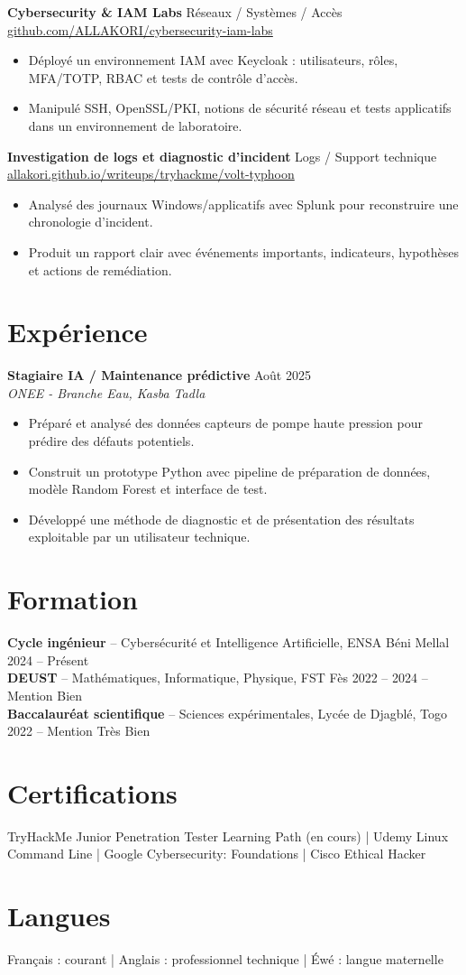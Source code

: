 \documentclass[10pt,a4paper]{article}
\newcommand{\role}[3]{%
  \textbf{#1} \hfill #3\\
  \textit{#2}\vspace{1pt}
}
\newcommand{\edu}[4]{%
  \textbf{#1} -- #2 \hfill #3 #4\\[5pt]
}
\begin{document}
\textbf{Cybersecurity \& IAM Labs} \hfill Réseaux / Systèmes / Accès\\
\href{https://github.com/ALLAKORI/cybersecurity-iam-labs}{github.com/ALLAKORI/cybersecurity-iam-labs}
\begin{itemize}
  \item Déployé un environnement IAM avec Keycloak : utilisateurs, rôles, MFA/TOTP, RBAC et tests de contrôle d'accès.
  \item Manipulé SSH, OpenSSL/PKI, notions de sécurité réseau et tests applicatifs dans un environnement de laboratoire.
\end{itemize}

\textbf{Investigation de logs et diagnostic d'incident} \hfill Logs / Support technique\\
\href{https://allakori.github.io/writeups/posts/volt-typhoon-intrusion/}{allakori.github.io/writeups/tryhackme/volt-typhoon}
\begin{itemize}
  \item Analysé des journaux Windows/applicatifs avec Splunk pour reconstruire une chronologie d'incident.
  \item Produit un rapport clair avec événements importants, indicateurs, hypothèses et actions de remédiation.
\end{itemize}

\section{Expérience}
\role{Stagiaire IA / Maintenance prédictive}{ONEE - Branche Eau, Kasba Tadla}{Août 2025}
\begin{itemize}
  \item Préparé et analysé des données capteurs de pompe haute pression pour prédire des défauts potentiels.
  \item Construit un prototype Python avec pipeline de préparation de données, modèle Random Forest et interface de test.
  \item Développé une méthode de diagnostic et de présentation des résultats exploitable par un utilisateur technique.
\end{itemize}

\section{Formation}
\edu{Cycle ingénieur}{Cybersécurité et Intelligence Artificielle, ENSA Béni Mellal}{2024 -- Présent}{}
\edu{DEUST}{Mathématiques, Informatique, Physique, FST Fès}{2022 -- 2024}{-- Mention Bien}
\edu{Baccalauréat scientifique}{Sciences expérimentales, Lycée de Djagblé, Togo}{2022}{-- Mention Très Bien}

\section{Certifications}
TryHackMe Junior Penetration Tester Learning Path (en cours) | Udemy Linux Command Line | Google Cybersecurity: Foundations | Cisco Ethical Hacker

\section{Langues}
Français : courant | Anglais : professionnel technique | Éwé : langue maternelle
\end{document}
